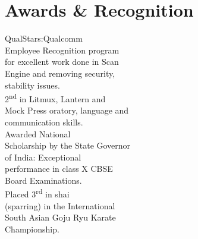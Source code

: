\documentclass[letterpaper]{deedy-resume} %
\begin{document}
\begin{minipage}[t]{0.23\textwidth} %


\section{Awards \& Recognition}
\footnotesize{
\textbullet[2015{} Won fastest Sorting \\ \hphantom{\textbullet{}}competition in Operating Systems.\\
\textbullet[2014]{} QualStars:Qualcomm \\ \hphantom{\textbullet{}}Employee Recognition program \\ \hphantom{\textbullet{}}for excellent work done in Scan \\ \hphantom{\textbullet{}}Engine and removing security,\\ \hphantom{\textbullet{}} stability issues.\\
\textbullet[2009]{} 2\textsuperscript{nd} in Litmux, Lantern and \\ \hphantom{\textbullet{}} Mock Press oratory,
language and \\ \hphantom{\textbullet{}} communication skills.\\
\textbullet[2006]{} Awarded National \\ \hphantom{\textbullet{}} Scholarship by the State Governor \\ \hphantom{\textbullet{}}of India:
Exceptional \\ \hphantom{\textbullet{}} performance in class X CBSE \\ \hphantom{\textbullet{}} Board Examinations.\\
\textbullet[2003]{} Placed 3\textsuperscript{rd} in shai \\ \hphantom{\textbullet{}} (sparring) in the International \\ \hphantom{\textbullet{}} South Asian
Goju Ryu Karate \\ \hphantom{\textbullet{}} Championship.\\
}

\end{minipage}
\end{document}
